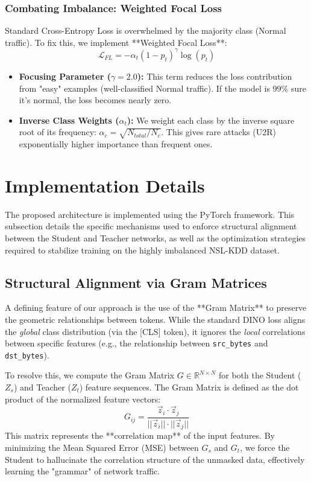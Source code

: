 \documentclass[
  10pt,
  twocolumn,
  a4paper,
  parskip=half
]{scrartcl}
\begin{document}
    \subsubsection{Combating Imbalance: Weighted Focal Loss}
    Standard Cross-Entropy Loss is overwhelmed by the majority class (Normal traffic). To fix this, we implement **Weighted Focal Loss**:
    \begin{equation}
        \mathcal{L}_{FL} = - \alpha_t (1 - p_t)^\gamma \log(p_t)
    \end{equation}
    \begin{itemize}
        \item \textbf{Focusing Parameter ($\gamma=2.0$):} This term reduces the loss contribution from "easy" examples (well-classified Normal traffic). If the model is 99\% sure it's normal, the loss becomes nearly zero.
        \item \textbf{Inverse Class Weights ($\alpha_t$):} We weight each class by the inverse square root of its frequency: $\alpha_c = \sqrt{N_{total} / N_c}$. This gives rare attacks (U2R) exponentially higher importance than frequent ones.
    \end{itemize}

    \section{Implementation Details}

    The proposed architecture is implemented using the PyTorch framework. This subsection details the specific mechanisms used to enforce structural alignment between the Student and Teacher networks, as well as the optimization strategies required to stabilize training on the highly imbalanced NSL-KDD dataset.

    \subsection{Structural Alignment via Gram Matrices}
    A defining feature of our approach is the use of the **Gram Matrix** to preserve the geometric relationships between tokens. While the standard DINO loss aligns the \textit{global} class distribution (via the [CLS] token), it ignores the \textit{local} correlations between specific features (e.g., the relationship between \texttt{src\_bytes} and \texttt{dst\_bytes}).

    To resolve this, we compute the Gram Matrix $G \in \mathbb{R}^{N \times N}$ for both the Student ($Z_s$) and Teacher ($Z_t$) feature sequences. The Gram Matrix is defined as the dot product of the normalized feature vectors:
    \begin{equation}
        G_{ij} = \frac{\vec{z}_i \cdot \vec{z}_j}{||\vec{z}_i|| \cdot ||\vec{z}_j||}
    \end{equation}
    This matrix represents the **correlation map** of the input features. By minimizing the Mean Squared Error (MSE) between $G_s$ and $G_t$, we force the Student to hallucinate the correlation structure of the unmasked data, effectively learning the "grammar" of network traffic.
\end{document}
